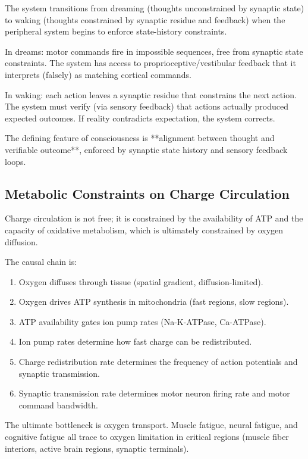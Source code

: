 \begin{principle}
\label{prin:consciousness-reality}
The system transitions from dreaming (thoughts unconstrained by synaptic state) to waking (thoughts constrained by synaptic residue and feedback) when the peripheral system begins to enforce state-history constraints.

In dreams: motor commands fire in impossible sequences, free from synaptic state constraints. The system has access to proprioceptive/vestibular feedback that it interprets (falsely) as matching cortical commands.

In waking: each action leaves a synaptic residue that constrains the next action. The system must verify (via sensory feedback) that actions actually produced expected outcomes. If reality contradicts expectation, the system corrects.

The defining feature of consciousness is **alignment between thought and verifiable outcome**, enforced by synaptic state history and sensory feedback loops.
\end{principle}

\subsection{Metabolic Constraints on Charge Circulation}
\label{subsec:metabolic-constraints}

Charge circulation is not free; it is constrained by the availability of ATP and the capacity of oxidative metabolism, which is ultimately constrained by oxygen diffusion.

\begin{principle}
\label{prin:oxygen-atp-charge}
The causal chain is:
\begin{enumerate}[label=(\arabic*), noitemsep]
\item Oxygen diffuses through tissue (spatial gradient, diffusion-limited).
\item Oxygen drives ATP synthesis in mitochondria (fast regions, slow regions).
\item ATP availability gates ion pump rates (Na-K-ATPase, Ca-ATPase).
\item Ion pump rates determine how fast charge can be redistributed.
\item Charge redistribution rate determines the frequency of action potentials and synaptic transmission.
\item Synaptic transmission rate determines motor neuron firing rate and motor command bandwidth.
\end{enumerate}

The ultimate bottleneck is oxygen transport. Muscle fatigue, neural fatigue, and cognitive fatigue all trace to oxygen limitation in critical regions (muscle fiber interiors, active brain regions, synaptic terminals).
\end{principle}

